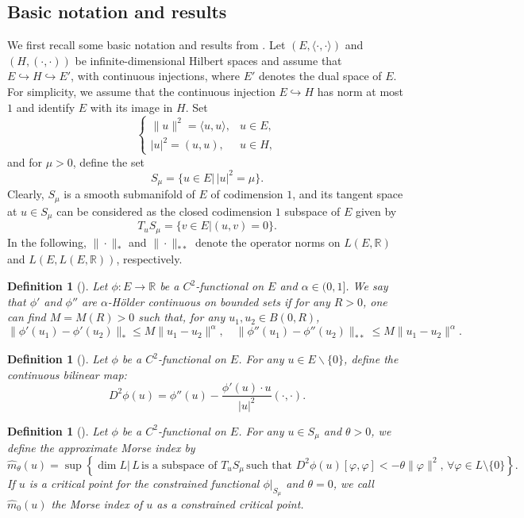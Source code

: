 \documentclass[11pt]{amsart}
\newtheorem{definition}[theorem]{Definition}
\newcommand{\abs}[1]{\lvert#1\rvert}
\newcommand{\blue}[1]{\textcolor{blue}{#1}}
\newcommand{\purple}[1]{\textcolor{revisionpurple}{#1}}
\numberwithin{equation}{section}
\begin{document}
\subsection{Basic notation and results}\label{subsectnotation}
We first recall some basic notation and results from \cite{Bort0,Bort}.
Let $(E, \langle \cdot, \cdot \rangle)$ and $(H, (\cdot, \cdot))$ be  infinite-dimensional Hilbert spaces and assume that $E \hookrightarrow H \hookrightarrow E'$, with continuous injections, where $E'$ denotes the dual space of $E$. For simplicity, we assume that the continuous injection $E \hookrightarrow H$ has norm at most $1$ and identify $E$ with its image in $H$. Set
$$
\begin{cases} 
\|u\|^2 = \langle u, u \rangle, & u \in E, \\
|u|^2 = (u, u), &  u \in H,
\end{cases}
$$
and for $\mu > 0$, define the set
$$S_\mu = \{u \in E | \, |u|^2 = \mu\}.$$ Clearly, $S_\mu$ is a smooth submanifold of $E$ of codimension $1$, and its tangent space at  $u \in S_\mu$ can be considered as the closed codimension $1$ subspace of $E$ given by
$$T_u S_\mu = \{ v \in E | (u, v) = 0 \}.$$
In the following,  $\| \cdot \|_*$ and $\| \cdot \|_{**}$ denote the operator norms on $L(E, \mathbb{R})$ and  $L(E, L(E, \mathbb{R}))$, respectively.
\begin{definition}[{\cite[Definition 2.1]{Bort}}]\label{defholder}
    Let $\phi : E \to \mathbb{R}$ be a $C^2$-functional on $E$ and $\alpha \in (0, 1]$. We say that $\phi'$ and $\phi''$ are $\alpha$-H\"older continuous on bounded sets if for any $R > 0$, one can find $M = M(R) > 0$ such that, for any $u_1, u_2 \in B(0, R)$,
$$\| \phi'(u_1) - \phi'(u_2) \|_* \leq M \| u_1 - u_2 \|^\alpha, \quad \| \phi''(u_1) - \phi''(u_2) \|_{**} \leq M \| u_1 - u_2 \|^\alpha. $$
\end{definition} 
\begin{definition}[{\cite[Definition 1.3]{Bort0}}]
Let $\phi$ be a $C^2$-functional on $E$. For any $u \in E\backslash\{0\}$,  define the continuous bilinear map\purple{:}\blue{}
$$D^2 \phi(u) = \phi''(u) - \frac{\phi'(u) \cdot u}{\abs{u}^2} (\cdot, \cdot).$$
\end{definition}
\begin{definition}[{\cite[Definition 1.4]{Bort0}}]Let $\phi$ be a $C^2$-functional on $E$. For any $u \in S_\mu$ and $\theta > 0$, we define the {\it approximate Morse index} by
$$\hat{m}_\theta (u) = \sup \left\{ \dim L \bigg| \, L \, \text{is a subspace of } T_u S_\mu \, \text{such that } D^2 \phi(u)[\varphi, \varphi] < -\theta \|\varphi\|^2, \, \forall \varphi \in L \setminus \{0\} \right\}.$$
If $u$ is a critical point for the constrained functional $\phi|_{S_\mu}$ and $\theta = 0$, we call $\hat m_0(u)$ the Morse index of $u$ as a constrained critical point.
\end{definition}
\end{document}
